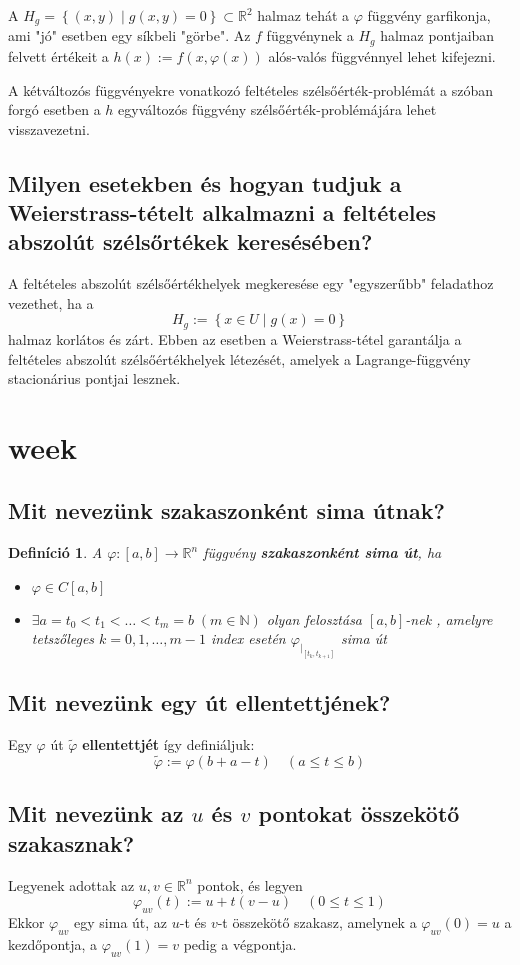 \documentclass[12pt,a4paper]{article}
\newcommand{\R}{\mathbb{R}}
\newcommand{\N}{\mathbb{N}}
\newcommand{\f}{\varphi}
\newcommand{\braces}[1]{\left\lbrace #1 \right\rbrace}
\newcommand{\boxes}[1]{\left[ #1 \right]}
\newtheorem{defi}{Definíció}[section]
\begin{document}
A $H_g = \braces{(x,y) \mid g(x,y) = 0} \subset \R^2$ halmaz tehát a $\f$ függvény garfikonja, ami "jó" esetben egy síkbeli "görbe". Az $f$ függvénynek a $H_g$ halmaz pontjaiban felvett értékeit a $h(x) := f(x,\f(x))$ alós-valós függvénnyel lehet kifejezni.

A kétváltozós függvényekre vonatkozó feltételes szélsőérték-problémát a szóban forgó esetben a $h$ egyváltozós függvény szélsőérték-problémájára lehet visszavezetni.
\subsection{Milyen esetekben és hogyan tudjuk a Weierstrass-tételt alkalmazni a feltételes abszolút szélsőrtékek keresésében?}
A feltételes abszolút szélsőértékhelyek megkeresése
egy "egyszerűbb" feladathoz vezethet, ha a
\[
H_g := \braces{x\in U \mid g(x) = 0}
\]
halmaz korlátos és zárt. Ebben az esetben a Weierstrass-tétel
garantálja a feltételes abszolút szélsőértékhelyek létezését, amelyek a Lagrange-függvény stacionárius pontjai lesznek.
\newpage
\section{week}
\subsection{Mit nevezünk szakaszonként sima útnak?}
\begin{defi}
A $\f : \boxes{a,b} \to \R^n$ függvény \textbf{szakaszonként sima
út}, ha
\begin{itemize}
\item $\f \in C \boxes{a,b}$
\item $\exists a = t_0 < t_ 1 < \ldots < t_m = b \; (m \in \N )$  olyan felosztása $\boxes{a,b}$-nek , amelyre tetszőleges $k = 0,1,\ldots,m-1$ index esetén $\f_{\vert_{\boxes{t_k,t_{k+1}}}}$ sima út
\end{itemize}
\end{defi}
\subsection{Mit nevezünk egy út ellentettjének?}
Egy $\f$ út $\tilde{\f}$ \textbf{ellentettjét} így definiáljuk:
\[
\tilde{\f} := \f(b+a-t) \quad (a \leq t \leq b)
\]
\subsection{Mit nevezünk az $u$ és $v$ pontokat összekötő szakasznak?}
Legyenek adottak az $u,v \in \R^n$  pontok, és legyen
\[
\f_{uv}(t) := u+t(v-u) \quad (0 \leq t \leq 1)
\]
Ekkor $\f_{uv}$ egy sima út, az $u$-t és $v$-t összekötő szakasz, amelynek a $\f_{uv}(0) = u$ a kezdőpontja, a $\f_{uv}(1) = v$ pedig a végpontja.
\end{document}
